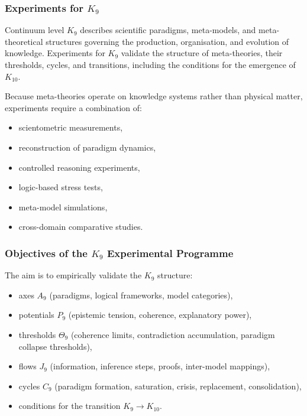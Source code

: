 
\subsubsection{Experiments for \texorpdfstring{$K_9$}{K_9}}
\label{sec:experiments-k9}

Continuum level $K_9$ describes scientific paradigms,
meta-models, and meta-theoretical structures governing the
production, organisation, and evolution of knowledge.
Experiments for $K_9$ validate the structure of meta-theories,
their thresholds, cycles, and transitions, including the
conditions for the emergence of $K_{10}$.

Because meta-theories operate on knowledge systems rather than
physical matter, experiments require a combination of:

\begin{itemize}
    \item scientometric measurements,
    \item reconstruction of paradigm dynamics,
    \item controlled reasoning experiments,
    \item logic-based stress tests,
    \item meta-model simulations,
    \item cross-domain comparative studies.
\end{itemize}



\subsubsection{Objectives of the \texorpdfstring{$K_9$}{K_9} Experimental Programme}

The aim is to empirically validate the $K_9$ structure:

\begin{itemize}
    \item axes $A_9$ (paradigms, logical frameworks, model categories),
    \item potentials $P_9$ (epistemic tension, coherence, explanatory power),
    \item thresholds $\Theta_9$ (coherence limits, contradiction accumulation,
          paradigm collapse thresholds),
    \item flows $J_9$ (information, inference steps, proofs,
          inter-model mappings),
    \item cycles $C_9$ (paradigm formation, saturation, crisis,
          replacement, consolidation),
    \item conditions for the transition $K_9 \to K_{10}$.
\end{itemize}



